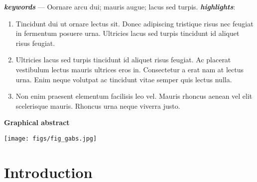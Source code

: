 \documentclass[11pt]{article}
\begin{document}
\begin{adjustwidth}{20pt}{20pt}
\begin{spacing}{0.8}
    \noindent \textit{\textbf{keywords}} --- Oornare arcu dui; mauris augue; lacus sed turpis.
    \newline
    \newline
    \newline
    \noindent \textit{\textbf{highlights}}:
        \begin{enumerate}
            \item Tincidunt dui ut ornare lectus sit. Donec adipiscing tristique risus nec feugiat in fermentum posuere urna. Ultricies lacus sed turpis tincidunt id aliquet risus feugiat. 
            \item Ultricies lacus sed turpis tincidunt id aliquet risus feugiat. Ac placerat vestibulum lectus mauris ultrices eros in. Consectetur a erat nam at lectus urna. Enim neque volutpat ac tincidunt vitae semper quis lectus nulla.
            \item Non enim praesent elementum facilisis leo vel. Mauris rhoncus aenean vel elit scelerisque mauris. Rhoncus urna neque viverra justo. 
        \end{enumerate}
\end{spacing}
\clearpage
\begin{center}
    \vspace{10mm}
    \textsf{\textbf{Graphical abstract}}
    \vspace{5mm}
\end{center}
    
\end{adjustwidth}
    
\begin{center}
    \texttt{[image: figs/fig\_gabs.jpg]}
\end{center}        
\clearpage

\normalsize

\tableofcontents
\clearpage    

\listoffigures
\clearpage	

\linenumbers %
	
\section{Introduction} \label{sec:intro}
\end{document}

